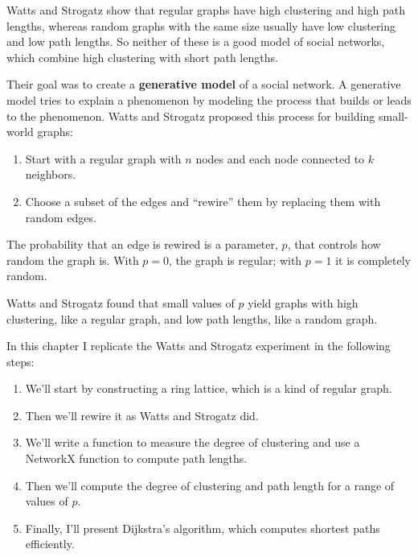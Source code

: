 \documentclass[12pt]{book}
\theoremstyle{exercise}
\begin{document}
Watts and Strogatz show that regular graphs
have high clustering and high path lengths, whereas
random graphs with the same size usually have low clustering
and low path lengths.  So neither of these is a good model of
social networks, which combine high clustering with
short path lengths.

Their goal was to create a {\bf generative model} of a social
network.  A generative model tries to explain a phenomenon by
modeling the process that builds or leads to the phenomenon.
Watts and Strogatz proposed this process for building
small-world graphs:

\begin{enumerate}

\item Start with a regular graph with $n$ nodes and each node
  connected to $k$ neighbors.

\item Choose a subset of the edges and ``rewire'' them by
  replacing them with random edges.

\end{enumerate}

The probability that an edge is rewired is a parameter, $p$,
that controls how random the graph is.  With $p=0$, the graph
is regular; with $p=1$ it is completely random.

Watts and Strogatz found that small values of $p$ yield graphs
with high clustering, like a regular graph, and low path
lengths, like a random graph.

In this chapter I replicate the Watts and Strogatz experiment
in the following steps:

\begin{enumerate}

\item We'll start by constructing a ring lattice, which is a kind
of regular graph.

\item Then we'll rewire it as Watts and Strogatz did.

\item We'll write a function to measure the degree of clustering
and use a NetworkX function to compute path lengths.

\item Then we'll compute the degree of clustering and path length for
a range of values of $p$.

\item Finally, I'll present Dijkstra's algorithm, which computes shortest paths efficiently.

\end{enumerate}
\end{document}
